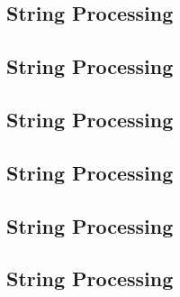 \raggedbottom
\vspace{-.7\baselineskip}\hrulefill
\vspace{0.1\baselineskip}\subsection{String Processing}
\raggedbottom
\vspace{-.7\baselineskip}\hrulefill
\vspace{0.1\baselineskip}\subsection{String Processing}
\raggedbottom
\vspace{-.7\baselineskip}\hrulefill
\vspace{0.1\baselineskip}\subsection{String Processing}
\raggedbottom
\vspace{-.7\baselineskip}\hrulefill
\vspace{0.1\baselineskip}\subsection{String Processing}
\raggedbottom
\vspace{-.7\baselineskip}\hrulefill
\vspace{0.1\baselineskip}\subsection{String Processing}
\raggedbottom
\vspace{-.7\baselineskip}\hrulefill
\vspace{0.1\baselineskip}\subsection{String Processing}
\raggedbottom
\vspace{-.7\baselineskip}\hrulefill
